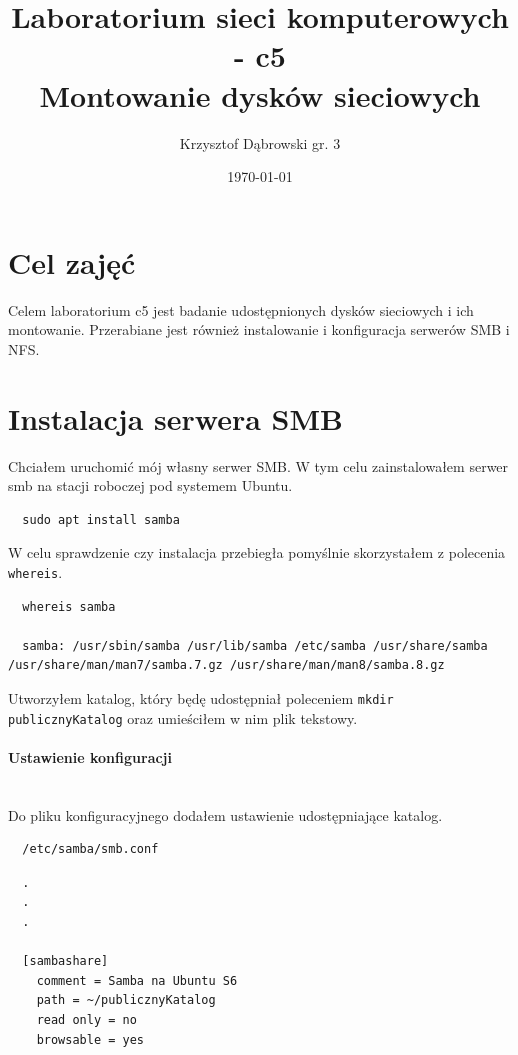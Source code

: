 \documentclass{article} %
\title{Laboratorium sieci komputerowych - c5 \\ Montowanie dysków sieciowych}
\author{Krzysztof Dąbrowski gr. 3}
\date{\today}
\begin{document}
\maketitle{}
\tableofcontents{}

\section{Cel zajęć}
Celem laboratorium c5 jest badanie udostępnionych dysków sieciowych i ich montowanie.
Przerabiane jest również instalowanie i konfiguracja serwerów SMB i NFS.

\section{Instalacja serwera SMB}
Chciałem uruchomić mój własny serwer SMB. W tym celu zainstalowałem serwer smb na stacji roboczej pod systemem Ubuntu.

\begin{verbatim}
  sudo apt install samba
\end{verbatim}

W celu sprawdzenie czy instalacja przebiegła pomyślnie skorzystałem z polecenia \texttt{whereis}.
\begin{verbatim}
  whereis samba

  samba: /usr/sbin/samba /usr/lib/samba /etc/samba /usr/share/samba /usr/share/man/man7/samba.7.gz /usr/share/man/man8/samba.8.gz
\end{verbatim}

Utworzyłem katalog, który będę udostępniał poleceniem \texttt{mkdir publicznyKatalog} oraz umieściłem w nim plik tekstowy.

\paragraph{Ustawienie konfiguracji} \mbox{} \\
Do pliku konfiguracyjnego dodałem ustawienie udostępniające katalog.

\begin{tcolorbox}[colback=yellow!10!white,colframe=red!45!black,coltitle=yellow!100!black, title=Konfiguracja serwera SMB]
  \begin{lstlisting}
  /etc/samba/smb.conf
  \end{lstlisting}
  \tcblower
  \footnotesize
  \begin{lstlisting}
  .
  .
  .

  [sambashare]
    comment = Samba na Ubuntu S6
    path = ~/publicznyKatalog
    read only = no
    browsable = yes 
  \end{lstlisting}
\end{tcolorbox}
\normalsize
\end{document}
